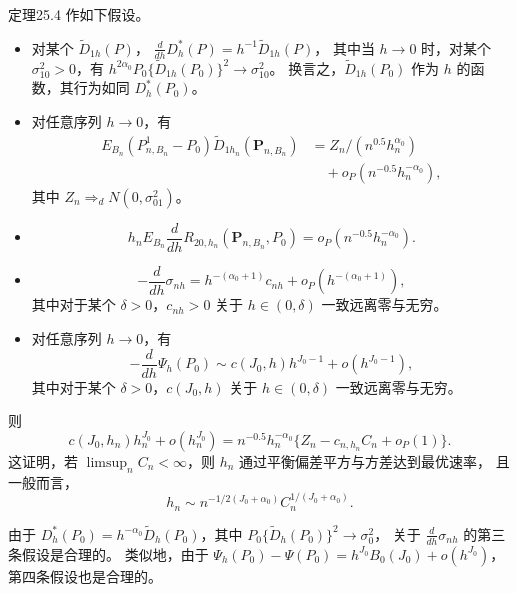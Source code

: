 \begin{bookresult}{定理}{25.4}
作如下假设。
\begin{itemize}
\item 对某个 $\tilde D_{1h}(P)$，
$\frac{d}{dh}D_h^*(P)=h^{-1}\tilde D_{1h}(P)$，
其中当 $h\to0$ 时，对某个 $\sigma_{10}^2>0$，有
$h^{2\alpha_0}P_0\{\tilde D_{1h}(P_0)\}^2\to\sigma_{10}^2$。
换言之，$\tilde D_{1h}(P_0)$ 作为 $h$ 的函数，其行为如同 $D_h^*(P_0)$。
\item 对任意序列 $h\to0$，有
\[
\begin{aligned}
 E_{B_n}(P^1_{n,B_n}-P_0)\tilde D_{1h_n}(\mathbf P_{n,B_n})
 &=Z_n/(n^{0.5}h_n^{\alpha_0})\\
 &\quad+o_P(n^{-0.5}h_n^{-\alpha_0}),
\end{aligned}
\]
其中 $Z_n\Rightarrow_dN(0,\sigma_{01}^2)$。
\item
\[
 h_nE_{B_n}\frac{d}{dh}R_{20,h_n}(\mathbf P_{n,B_n},P_0)
 =o_P(n^{-0.5}h_n^{-\alpha_0}).
\]
\item
\[
 -\frac{d}{dh}\sigma_{nh}
 =h^{-(\alpha_0+1)}c_{nh}+o_P(h^{-(\alpha_0+1)}),
\]
其中对于某个 $\delta>0$，$c_{nh}>0$ 关于 $h\in(0,\delta)$ 一致远离零与无穷。
\item 对任意序列 $h\to0$，有
\[
 -\frac{d}{dh}\Psi_h(P_0)
 \sim c(J_0,h)h^{J_0-1}+o(h^{J_0-1}),
\]
其中对于某个 $\delta>0$，$c(J_0,h)$ 关于 $h\in(0,\delta)$ 一致远离零与无穷。
\end{itemize}
则
\[
 c(J_0,h_n)h_n^{J_0}+o(h_n^{J_0})
 =n^{-0.5}h_n^{-\alpha_0}
 \{Z_n-c_{n,h_n}C_n+o_P(1)\}.
\]
这证明，若 $\limsup_nC_n<\infty$，则 $h_n$ 通过平衡偏差平方与方差达到最优速率，
且一般而言，
\[
 h_n\sim n^{-1/2(J_0+\alpha_0)}C_n^{1/(J_0+\alpha_0)}.
\]
\end{bookresult}

由于 $D_h^*(P_0)=h^{-\alpha_0}\tilde D_h(P_0)$，其中
$P_0\{\tilde D_h(P_0)\}^2\to\sigma_0^2$，
关于 $\frac{d}{dh}\sigma_{nh}$ 的第三条假设是合理的。
类似地，由于
$\Psi_h(P_0)-\Psi(P_0)=h^{J_0}B_0(J_0)+o(h^{J_0})$，
第四条假设也是合理的。

